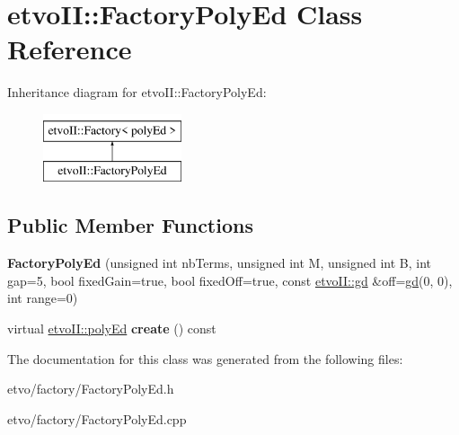\hypertarget{classetvo_i_i_1_1_factory_poly_ed}{}\section{etvo\+II\+:\+:Factory\+Poly\+Ed Class Reference}
\label{classetvo_i_i_1_1_factory_poly_ed}
Inheritance diagram for etvo\+II\+:\+:Factory\+Poly\+Ed\+:\begin{figure}[H]
\begin{center}
\leavevmode
\includegraphics[height=2.000000cm]{classetvo_i_i_1_1_factory_poly_ed}
\end{center}
\end{figure}
\subsection*{Public Member Functions}
\begin{DoxyCompactItemize}
\item 
\mbox{\label{classetvo_i_i_1_1_factory_poly_ed_a4d037f3b18493820a5c9abdf6ee4ca64}} 
{\bfseries Factory\+Poly\+Ed} (unsigned int nb\+Terms, unsigned int M, unsigned int B, int gap=5, bool fixed\+Gain=true, bool fixed\+Off=true, const \mbox{\hyperlink{classetvo_i_i_1_1gd}{etvo\+I\+I\+::gd}} \&off=\mbox{\hyperlink{classetvo_i_i_1_1gd}{gd}}(0, 0), int range=0)
\item 
\mbox{\label{classetvo_i_i_1_1_factory_poly_ed_addf2b16db2accf6e938bf96e18af5c7f}} 
virtual \mbox{\hyperlink{classetvo_i_i_1_1poly_ed}{etvo\+I\+I\+::poly\+Ed}} {\bfseries create} () const
\end{DoxyCompactItemize}


The documentation for this class was generated from the following files\+:\begin{DoxyCompactItemize}
\item 
etvo/factory/Factory\+Poly\+Ed.\+h\item 
etvo/factory/Factory\+Poly\+Ed.\+cpp\end{DoxyCompactItemize}
